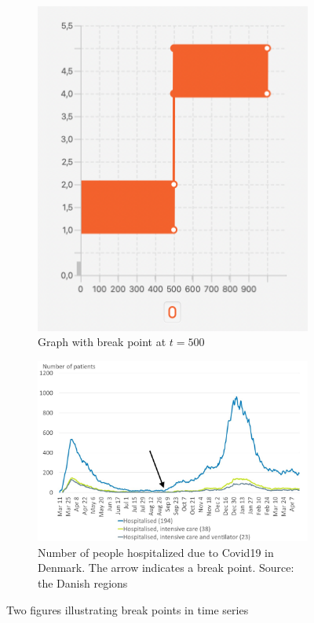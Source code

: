 \begin{figure}[h]
    \centering
    \begin{subfigure}[b]{0.45\textwidth}
        \centering
        \includegraphics[width=\textwidth]{fig/simple-graph.png}
        \caption{Graph with break point at $t = 500$}
        \label{fig:simple-graph}
    \end{subfigure}
    \hfill
    \begin{subfigure}[b]{0.45\textwidth}
        \centering
        \includegraphics[width=\textwidth]{fig/covid19-dk-en.jpg}
        \caption{Number of people hospitalized due to Covid19 in Denmark. The %
        arrow indicates a break point. Source: the Danish regions}
        \label{fig:covid19-dk-en}
    \end{subfigure}
    \caption{Two figures illustrating break points in time series}
    \label{fig:intro-figure}
\end{figure}
